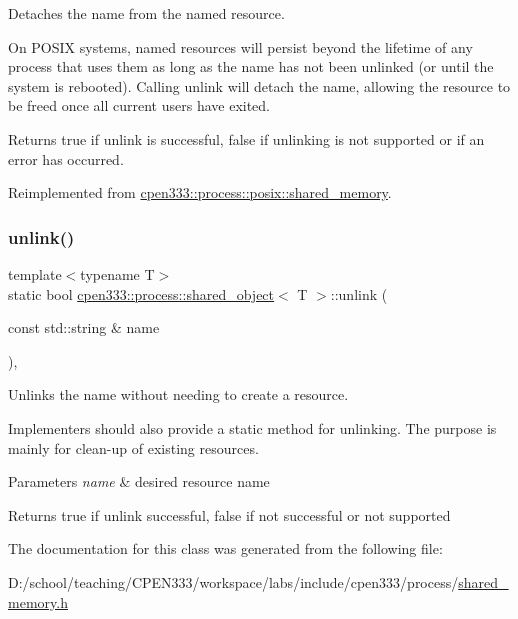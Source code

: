 Detaches the name from the named resource. 

On P\+O\+S\+IX systems, named resources will persist beyond the lifetime of any process that uses them as long as the name has not been unlinked (or until the system is rebooted). Calling {\ttfamily unlink} will detach the name, allowing the resource to be freed once all current users have exited.

\begin{DoxyReturn}{Returns}
{\ttfamily true} if unlink is successful, {\ttfamily false} if unlinking is not supported or if an error has occurred. 
\end{DoxyReturn}


Reimplemented from \hyperlink{classcpen333_1_1process_1_1posix_1_1shared__memory_a3b6d67a41cfaca3712d87958682d8bbe}{cpen333\+::process\+::posix\+::shared\+\_\+memory}.

\mbox{\label{classcpen333_1_1process_1_1shared__object_a478c2228031b8471b1e729ce78aabd97}} 
\subsubsection{\texorpdfstring{unlink()}{unlink()}\hspace{0.1cm}{\footnotesize\ttfamily [2/2]}}
{\footnotesize\ttfamily template$<$typename T$>$ \\
static bool \hyperlink{classcpen333_1_1process_1_1shared__object}{cpen333\+::process\+::shared\+\_\+object}$<$ T $>$\+::unlink (\begin{DoxyParamCaption}\item[{const std\+::string \&}]{name }\end{DoxyParamCaption})\hspace{0.3cm}{\ttfamily [inline]}, {\ttfamily [static]}}



Unlinks the name without needing to create a resource. 

Implementers should also provide a static method for unlinking. The purpose is mainly for clean-\/up of existing resources.


\begin{DoxyParams}{Parameters}
{\em name} & desired resource name \\
\hline
\end{DoxyParams}
\begin{DoxyReturn}{Returns}
{\ttfamily true} if unlink successful, {\ttfamily false} if not successful or not supported 
\end{DoxyReturn}


The documentation for this class was generated from the following file\+:\begin{DoxyCompactItemize}
\item 
D\+:/school/teaching/\+C\+P\+E\+N333/workspace/labs/include/cpen333/process/\hyperlink{shared__memory_8h}{shared\+\_\+memory.\+h}\end{DoxyCompactItemize}
